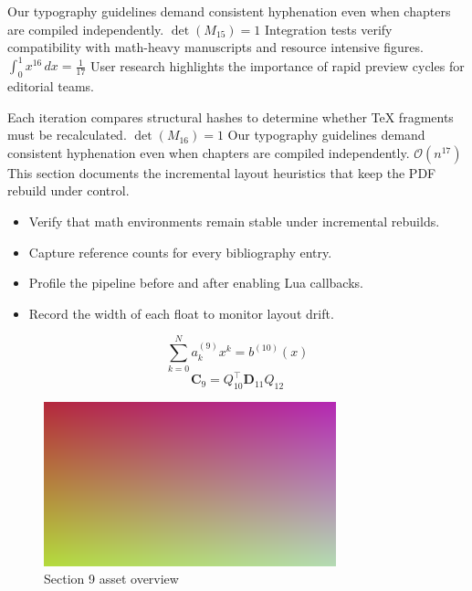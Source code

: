     Our typography guidelines demand consistent hyphenation even when chapters are compiled independently.  $\det(M_{15}) = 1$  Integration tests verify compatibility with math-heavy manuscripts and resource intensive figures.  $\int_{0}^{1} x^{16} \, dx = \frac{1}{17}$  User research highlights the importance of rapid preview cycles for editorial teams.
    \par
  
    Each iteration compares structural hashes to determine whether TeX fragments must be recalculated.  $\det(M_{16}) = 1$  Our typography guidelines demand consistent hyphenation even when chapters are compiled independently.  $\mathcal{O}(n^{17})$  This section documents the incremental layout heuristics that keep the PDF rebuild under control.
    \par
  
    \begin{itemize}
      
    \item Verify that math environments remain stable under incremental rebuilds.
    \item Capture reference counts for every bibliography entry.
    \item Profile the pipeline before and after enabling Lua callbacks.
    \item Record the width of each float to monitor layout drift.
    \end{itemize}
\begin{equation}
\label{eq:sec9-eq1}
\sum_{k=0}^{N} a_k^{(9)} x^k = b^{(10)}(x)
\end{equation}
\[
\mathbf{C}_{9} = Q_{10}^{\top} \mathbf{D}_{11} Q_{12}
\]

    \begin{figure}[htbp]
      \centering
      
          \includegraphics[width=0.82\linewidth]{../assets/images/placeholder2.png}
        
        \caption{Section 9 asset overview}
      
        \label{fig:fig-sec9}
      
    \end{figure}
  
